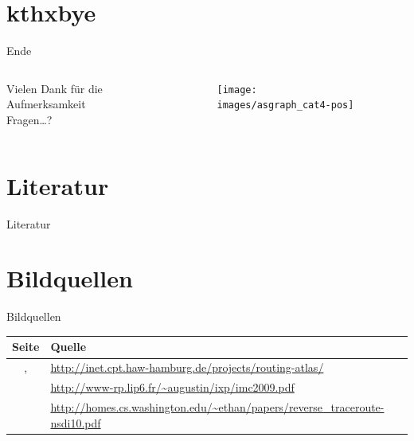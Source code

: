 \documentclass[ngerman,compress]{beamer}
\begin{document}
\section{kthxbye}
\begin{frame}[plain]{Ende}
\begin{columns}[t]
\begin{column}{0.5\textwidth}
 \begin{center}
 \vspace{1cm}
 Vielen Dank für die Aufmerksamkeit\\
 \vspace{1.5cm}
 Fragen\ldots?
 \end{center}
\end{column}
\begin{column}{0.5\textwidth}
 \vspace{-1cm}
 \begin{figure}
  \label{asngraphs2}
  \texttt{[image: images/asgraph\_cat4-pos]}
 \end{figure}
\end{column}
\end{columns}
\end{frame}

\section{Literatur}
\begin{frame}{Literatur}
\scriptsize


\end{frame}

\section{Bildquellen}
\begin{frame}[plain]{Bildquellen}
  \scriptsize
  \begin{table}
    \begin{tabular}{ c p{} }
      Seite & Quelle \\ \hline
      \pageref{asgraphs}, \pageref{asngraphs2} & \url{http://inet.cpt.haw-hamburg.de/projects/routing-atlas/}\\ \hline
      \pageref{augustin_ixp} & \url{http://www-rp.lip6.fr/~augustin/ixp/imc2009.pdf} \\ \hline
      \pageref{reverse_traceroute} & \url{http://homes.cs.washington.edu/~ethan/papers/reverse_traceroute-nsdi10.pdf} \\ \hline
    \end{tabular}
  \end{table}
\end{frame}
\end{document}
